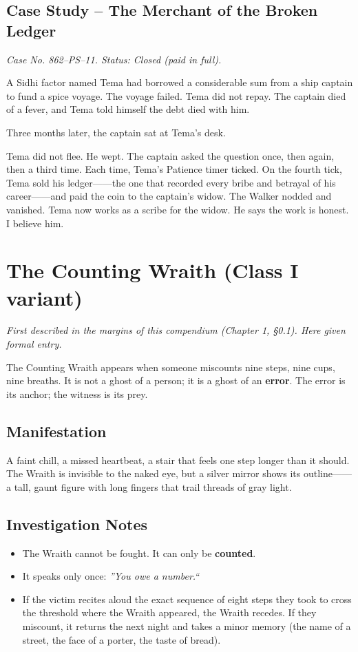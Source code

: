 \subsection{Case Study -- The Merchant of the Broken Ledger}

\emph{Case No. 862--PS--11. Status: Closed (paid in full).}

A Sidhi factor named Tema had borrowed a considerable sum from a ship captain to fund a spice voyage. The voyage failed. Tema did not repay. The captain died of a fever, and Tema told himself the debt died with him.

Three months later, the captain sat at Tema's desk.

Tema did not flee. He wept. The captain asked the question once, then again, then a third time. Each time, Tema's Patience timer ticked. On the fourth tick, Tema sold his ledger------the one that recorded every bribe and betrayal of his career------and paid the coin to the captain's widow. The Walker nodded and vanished. Tema now works as a scribe for the widow. He says the work is honest. I believe him.

\section{The Counting Wraith (Class I variant)}

\emph{First described in the margins of this compendium (Chapter 1, \S 0.1). Here given formal entry.}

The Counting Wraith appears when someone miscounts nine steps, nine cups, nine breaths. It is not a ghost of a person; it is a ghost of an \textbf{error}. The error is its anchor; the witness is its prey.

\subsection{Manifestation}

A faint chill, a missed heartbeat, a stair that feels one step longer than it should. The Wraith is invisible to the naked eye, but a silver mirror shows its outline------a tall, gaunt figure with long fingers that trail threads of gray light.

\subsection{Investigation Notes}

\begin{itemize}
    \item The Wraith cannot be fought. It can only be \textbf{counted}.
    \item It speaks only once: \emph{''You owe a number.``}
    \item If the victim recites aloud the exact sequence of eight steps they took to cross the threshold where the Wraith appeared, the Wraith recedes. If they miscount, it returns the next night and takes a minor memory (the name of a street, the face of a porter, the taste of bread).
\end{itemize}

